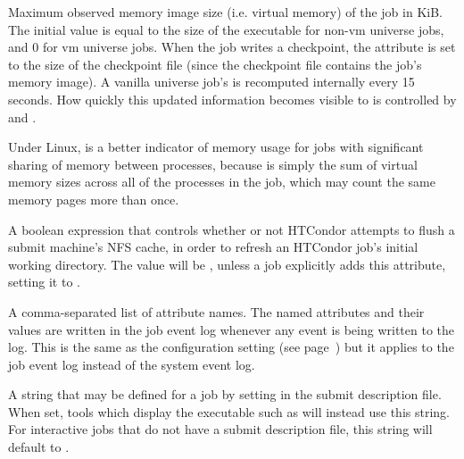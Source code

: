 \begin{description}
\item[\AdAttr{ImageSize}:]  Maximum observed memory image size
(i.e. virtual memory) of the
job in KiB.  The initial value is equal to the size of the
executable for non-vm universe jobs, and 0 for vm universe jobs.
When the job writes a checkpoint, the 
attribute is set to the size of the checkpoint file (since the
checkpoint file contains the job's memory image).
A vanilla universe job's  is recomputed
internally every 15 seconds.
How quickly this updated information becomes visible to  is
controlled by  and
.

Under Linux,  is a better indicator of
memory usage for jobs with significant sharing of memory between
processes, because  is simply the sum of virtual
memory sizes across all of the processes in the job, which may count
the same memory pages more than once.

\label{IwdFlushNFSCache-job-attribute}
\item[\AdAttr{IwdFlushNFSCache}:]  A boolean expression that controls
whether or not HTCondor attempts to flush a submit machine's NFS cache,
in order to refresh an HTCondor job's initial working directory.
The value will be , unless a job explicitly adds this
attribute, setting it to .

\label{JobAdInformationAttrs-job-attribute}
\item[\AdAttr{JobAdInformationAttrs}:] A comma-separated list
of attribute names.  The named attributes and their values are written
in the job event log whenever any event is being written to the log.
This is the same as the configuration setting
 (see
page~\pageref{param:EventLogJobAdInformationAttrs}) but it applies to
the job event log instead of the system event log.

\label{JobDescription-job-attribute}
\item[\AdAttr{JobDescription}:]  A string that may be defined for
a job by setting  in the submit description file.
When set, tools which display the executable such as 
will instead use this string.
For interactive jobs that do not have a submit description file,
this string will default to .


\end{description}

